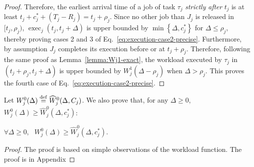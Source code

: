 \begin{proof}
  Therefore, the earliest arrival time of a job of task $\tau_j$
  \emph{strictly after} $t_j$ is at least $t_j + c_j^* + (T_j-R_j) = t_j+\rho_j$. Since no other job than $J_j$ is released in $[t_j, \rho_j)$, $\operatorname{exec}_j(t_j, t_j+\Delta)$ is upper bounded by $\min\left\{ \Delta, c_j^* \right\}$ for $\Delta \leq \rho_j$, thereby proving cases 2 and 3 of Eq.~\eqref{eq:execution-case2-precise}. Furthermore, by assumption $J_j$ completes its execution before or at $t_j + \rho_j$. Therefore, following the same proof as Lemma~\ref{lemma:Wj1-exact}, the workload executed by $\tau_j$ in $(t_j + \rho_j, t_j + \Delta)$ is upper bounded by $W_j^1(\Delta -\rho_j)$ when $\Delta > \rho_j$. This proves the fourth case of Eq.~\eqref{eq:execution-case2-precise}.
\end{proof}

Let $W_j^0(\Delta)\stackrel{\mathrm{def}}{=} \widehat{W}_j^0(\Delta, C_j)$. We also prove that, for any $\Delta \geq 0$, $W_j^0(\Delta) \geq \widehat{W}_j^0(\Delta, c_j^*)$:
\begin{Lemma}
\label{lemma:Wj0-dominate}
$\forall \Delta \geq 0$,~ $W_j^0(\Delta) \geq \widehat{W}_j^0(\Delta, c_j^*)$.
\end{Lemma}
\begin{proof}
 The proof is based on simple observations of the workload function. The proof is in Appendix
\end{proof}



